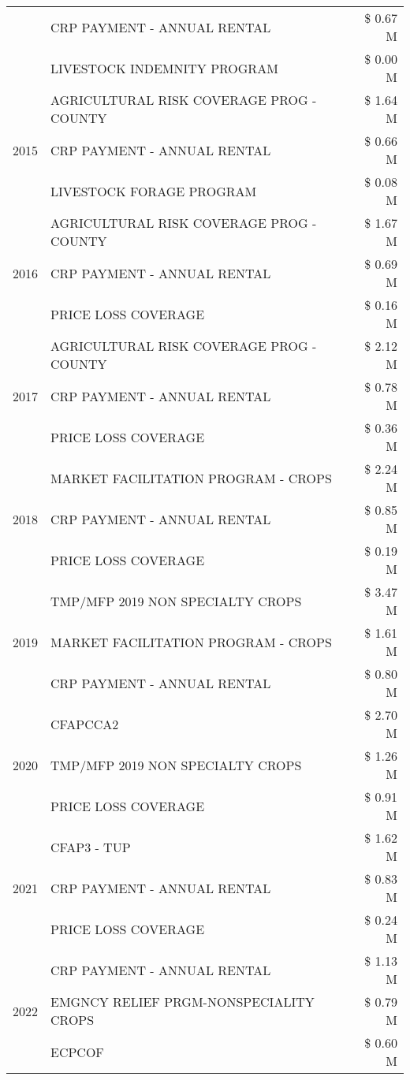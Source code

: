 \begin{tabular}{llr}
 & CRP PAYMENT - ANNUAL RENTAL & \$ 0.67 M \\
 & LIVESTOCK INDEMNITY PROGRAM & \$ 0.00 M \\
\cline{1-3}
\multirow[t]{3}{*}{2015} & AGRICULTURAL RISK COVERAGE PROG - COUNTY & \$ 1.64 M \\
 & CRP PAYMENT - ANNUAL RENTAL & \$ 0.66 M \\
 & LIVESTOCK FORAGE PROGRAM & \$ 0.08 M \\
\cline{1-3}
\multirow[t]{3}{*}{2016} & AGRICULTURAL RISK COVERAGE PROG - COUNTY & \$ 1.67 M \\
 & CRP PAYMENT - ANNUAL RENTAL & \$ 0.69 M \\
 & PRICE LOSS COVERAGE & \$ 0.16 M \\
\cline{1-3}
\multirow[t]{3}{*}{2017} & AGRICULTURAL RISK COVERAGE PROG - COUNTY & \$ 2.12 M \\
 & CRP PAYMENT - ANNUAL RENTAL & \$ 0.78 M \\
 & PRICE LOSS COVERAGE & \$ 0.36 M \\
\cline{1-3}
\multirow[t]{3}{*}{2018} & MARKET FACILITATION PROGRAM - CROPS & \$ 2.24 M \\
 & CRP PAYMENT - ANNUAL RENTAL & \$ 0.85 M \\
 & PRICE LOSS COVERAGE & \$ 0.19 M \\
\cline{1-3}
\multirow[t]{3}{*}{2019} & TMP/MFP 2019 NON SPECIALTY CROPS & \$ 3.47 M \\
 & MARKET FACILITATION PROGRAM - CROPS & \$ 1.61 M \\
 & CRP PAYMENT - ANNUAL RENTAL & \$ 0.80 M \\
\cline{1-3}
\multirow[t]{3}{*}{2020} & CFAPCCA2 & \$ 2.70 M \\
 & TMP/MFP 2019 NON SPECIALTY CROPS & \$ 1.26 M \\
 & PRICE LOSS COVERAGE & \$ 0.91 M \\
\cline{1-3}
\multirow[t]{3}{*}{2021} & CFAP3 - TUP & \$ 1.62 M \\
 & CRP PAYMENT - ANNUAL RENTAL & \$ 0.83 M \\
 & PRICE LOSS COVERAGE & \$ 0.24 M \\
\cline{1-3}
\multirow[t]{3}{*}{2022} & CRP PAYMENT - ANNUAL RENTAL & \$ 1.13 M \\
 & EMGNCY RELIEF PRGM-NONSPECIALITY CROPS & \$ 0.79 M \\
 & ECPCOF & \$ 0.60 M \\
\cline{1-3}
\bottomrule
\end{tabular}
